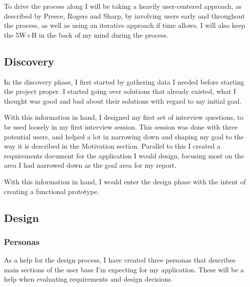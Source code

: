 \documentclass[a4paper,11pt]{report}
\begin{document}
To drive the process along I will be taking a heavily user-centered approach, as
described by Preece, Rogers and Sharp\cite{preece07:_inter_desig}, by involving
users early and throughout the process, as well as using an iterative approach
if time allows. I will also keep the 5W+H\cite{heim08:_reson_inter} in the back
of my mind during the process.

\subsection{Discovery}

In the discovery phase, I first started by gathering data I needed before
starting the project proper. I started going over solutions that already
existed, what I thought was good and bad about their solutions with regard to my
initial goal.

With this information in hand, I designed my first set of interview questions,
to be used loosely in my first interview session. This session was done with
three potential users, and helped a lot in narrowing down and shaping my goal
to the way it is described in the Motivation section. Parallel to this I created
a requirements document for the application I would design, focusing most on the
area I had narrowed down as the goal area for my report.

With this information in hand, I would enter the design phase with the intent of
creating a functional prototype.

\subsection{Design}

\subsubsection{Personas}

As a help for the design process, I have created three personas that describes
main sections of the user base I'm expecting for my application. These will be a
help when evaluating requirements and design decisions.
\end{document}
